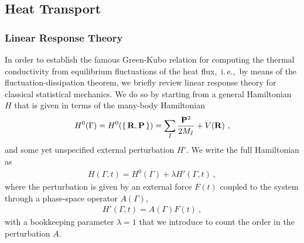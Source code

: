 \subsection{Heat Transport}
\subsubsection{Linear Response Theory}
\cite{Einstein1905a,Onsager1931a,Onsager1931b,Kubo1957a,Kubo1957b}
\cite[p. 68]{Lomen1986} \cite{Tuckerman}

In order to establish the famous Green-Kubo relation for computing the thermal conductivity from equilibrium fluctuations of the heat flux,~i.\,e.,~by means of the fluctuation-dissipation theorem, we briefly review linear response theory for classical statistical mechanics. We do so by starting from a general Hamiltonian $H$ that is given in terms of the many-body Hamiltonian
\begin{align}
  H^0 (\Gamma) 
    = H^0(\set{{\bf R}, {\bf P}})
    = \sum_I \frac{{\bf P}^2}{2 M_I} + V ({\bf R})~,
  \label{eq:lr.H0}
\end{align}
and some yet unspecified external perturbation $H'$. We write the full Hamiltonian as
\begin{align}
  H (\Gamma, t)
   = H^0 (\Gamma) + \lambda H' (\Gamma, t)~,
  \label{eq:lr.H}
\end{align}
where the perturbation is given by an external force $F(t)$ coupled to the system through a phase-space operator $A (\Gamma)$,
\begin{align}
  H' (\Gamma, t) = A (\Gamma) F (t)~,
  \label{eq:lr.H'}
\end{align}
with a bookkeeping parameter $\lambda = 1$ that we introduce to count the order in the perturbation $A$.


